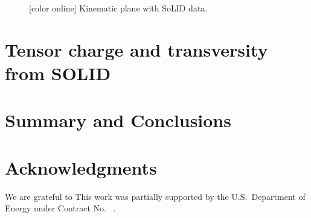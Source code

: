 \documentclass[twocolumn,showpacs,preprintnumbers,amsmath,amssymb,floatfix,prd]{revtex4}
\newcommand*{\BibPath}{.}%
\begin{document}
%
\begin{figure}[thb!]
\vspace*{-0.4cm}
\begin{center}
\vspace*{-0.6cm}
 \end{center}
\vspace*{-0.7cm}
\caption{\label{fig:kimen} [color online]
Kinematic plane with SoLID data.}
\end{figure}
%
 

 
\section{Tensor charge and transversity from SOLID}

\section{Summary and Conclusions}
%
 

\section*{Acknowledgments}
%
We are grateful to  
This work was partially supported by   the
U.S.\ Department of Energy under Contract No.~ .


 
\end{document}
